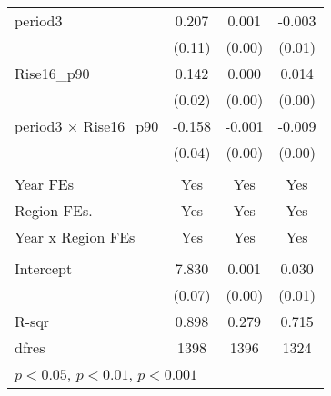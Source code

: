 \begin{table}[H]
{\begin{tabular}{l*{3}{c}}
period3         &       0.207         &       0.001         &      -0.003         \\
                    &      (0.11)         &      (0.00)         &      (0.01)         \\
Rise16\_p90     &       0.142\sym{***}&       0.000\sym{*}  &       0.014\sym{***}\\
                    &      (0.02)         &      (0.00)         &      (0.00)         \\
period3 $\times$ Rise16\_p90&      -0.158\sym{***}&      -0.001\sym{*}  &      -0.009\sym{**} \\
                    &      (0.04)         &      (0.00)         &      (0.00)         \\
\\
Year FEs                &       Yes       &     Yes        &     Yes        \\
Region FEs.           &       Yes       &     Yes        &     Yes        \\
Year x Region FEs &       Yes       &     Yes        &     Yes        \\
\\
Intercept            &       7.830\sym{***}&       0.001         &       0.030\sym{***}\\
                    &      (0.07)         &      (0.00)         &      (0.01)         \\
\hline
R-sqr               &       0.898         &       0.279         &       0.715         \\
dfres               &        1398         &        1396         &        1324         \\
\hline\hline
\multicolumn{4}{l}{\footnotesize \sym{*} \(p<0.05\), \sym{**} \(p<0.01\), \sym{***} \(p<0.001\)}\\
\end{tabular}%
}
\end{table}
